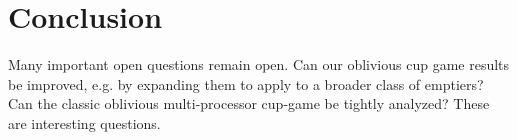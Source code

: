 \documentclass[twocolumn]{article}[10pt]
\begin{document}


\section{Conclusion}
Many important open questions remain open. Can our oblivious cup game results
be improved, e.g. by expanding them to apply to a broader class of emptiers?
Can the classic oblivious multi-processor cup-game be tightly analyzed?
These are interesting questions.



\end{document}
